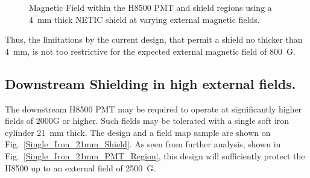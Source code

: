 \documentclass[12pt]{article}
\begin{document}
\begin{figure}[ht]
\centering
{}
\qquad
{}
\caption{\small{Magnetic Field within the H8500 PMT and shield regions using a 4~mm thick NETIC shield at varying external magnetic fields.}}\label{Upstream_NETIC_4mm}
\end{figure}
%
Thus, the limitations by the current design, 
that permit a shield no thicker than 4~mm, is not  too restrictive for the expected 
external magnetic field of 800~G.



\subsection{Downstream Shielding in high  external fields.}

The downstream H8500 PMT may be required to operate at significantly 
higher fields of $2000$G or higher.  Such fields may be tolerated with  a single  soft 
iron cylinder 21~mm thick. The design and a field map sample are  shown on 
Fig.~\ref{Single_Iron_21mm_Shield}. 
As seen from further analysis, shown in  Fig.~\ref{Single_Iron_21mm_PMT_Region},
this design  will sufficiently protect the H8500 up to an external field of 2500~G.  
\end{document}
